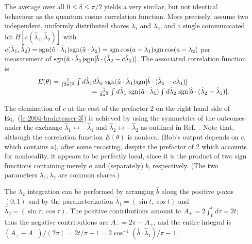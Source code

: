 \documentclass[prl,preprint,amsfonts,showpacs,showkeys]{revtex4}
\begin{document}
The average over all $0\le \delta \le \pi /2$
yields a very similar, but not identical behaviour
as the   quantum cosine correlation function.
More precisely,
assume two independent,
uniformly distributed shares ${\lambda}_1$ and ${\lambda}_2$, and
a single communicated bit $H\left[c({\hat  \lambda}_1,{\hat  \lambda}_2)\right]$ with
$c({\hat  \lambda}_1,{\hat  \lambda}_2)=
{\rm sgn}  ({\hat a} \cdot {\hat \lambda}_1){\rm sgn} ({\hat a} \cdot {\hat \lambda}_2)
= {\rm sgn} \cos ({ a} - { \lambda }_1 ){\rm sgn} \cos ({ a} - { \lambda }_2 )$
per measurement of
$
{\rm sgn} ({\hat a}\cdot {\hat \lambda}_1)
{\rm sgn}
[{\hat b}\cdot ({\hat \lambda}_2-c{\hat \lambda}_1)]
$.
The associated correlation function is
\begin{equation}
\begin{array}{cll}
&&E(\theta ) =
{1\over (2 \pi)^2}
\int d {\hat\lambda_1}  d {\hat\lambda_2}  \;
{\rm sgn}
({\hat a}\cdot {\hat \lambda}_1)
{\rm sgn}
[{\hat b}\cdot ({\hat \lambda}_2-c{\hat \lambda}_1)] \\
&&\qquad \qquad \qquad \qquad  =
{1\over 2 \pi^2}
\int d {\hat\lambda_1}  \;
{\rm sgn}
({\hat a}\cdot {\hat \lambda}_1)
\int d {\hat\lambda_2}    \;
{\rm sgn}
[{\hat b}\cdot ({\hat \lambda}_2-{\hat \lambda}_1)].
\end{array}
\label{e-2004-brainteaser-3}
\end{equation}

The elemination of $c$ at the cost of the prefactor $2$
on the right hand side of Eq.~(\ref{e-2004-brainteaser-3}) is achieved by
using the symmetries of the outcomes under the exchange
${\hat \lambda }_1 \longleftrightarrow -{\hat  \lambda }_1$
and
${\hat  \lambda }_2 \longleftrightarrow -{\hat  \lambda }_2$
as outlined in Ref.~\cite{toner-bacon-03}.
Note that, although the correlation function $E(\theta )$ is
nonlocal
(Bob's output depends on $c$, which contains ${ a}$),
after some recasting, despite the prefactor of 2 which accounts for nonlocality,
it appears to be perfectly local,
since it is the product of two sign functions
containing merely ${ a}$ and  (separately) ${b}$, respectively.
(The two parameters $ {\lambda }_1, {\lambda }_2$ are common shares.)

The ${\lambda}_2$ integration can be performed by
arranging
${\hat b}$ along the positive $y$-axis $(0,1)$ and by the parameterization
${\hat \lambda}_1=(\sin t ,\cos t )$
and
${\hat \lambda}_2=(\sin \tau ,\cos \tau )$.
The positive contributions amount to $A_+=2\int_0^t d\tau =2t$;
thus the negative contributions are $A_-= 2\pi -A_+$, and the entire integral
is $(A_+-A_-)/(2\pi )=2t/\pi -1=2\cos^{-1}({\hat b}\cdot {\hat \lambda}_1)/\pi -1$.
\end{document}

